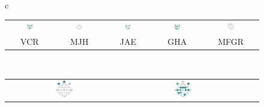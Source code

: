 \begin{figure}
\centering
\begin{tabular}{c}
\begin{tabular}{ccccc}
\includegraphics[width=0.15\textwidth]{./img_diagramas/cabecita_VCR.pdf} &
\includegraphics[width=0.15\textwidth]{./img_diagramas/cabecita_MJH.pdf} &
\includegraphics[width=0.15\textwidth]{./img_diagramas/cabecita_JAE.pdf} &
\includegraphics[width=0.15\textwidth]{./img_diagramas/cabecita_GHA.pdf} &
\includegraphics[width=0.15\textwidth]{./img_diagramas/cabecita_MFGR.pdf} \\
VCR & MJH & JAE & GHA & MFGR
\end{tabular}
\\
\begin{tabular}{cccc}
\includegraphics[width=0.15\textwidth]{./img_diagramas/cabecita_CLO.pdf} &
\includegraphics[width=0.15\textwidth]{./img_diagramas/cabecita_RLO.pdf} &

\end{tabular}
\end{tabular}
\end{figure}
